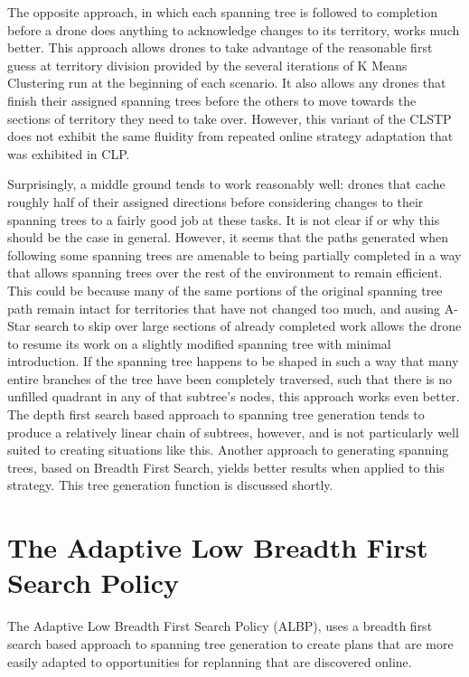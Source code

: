 The opposite approach, in which each spanning tree is followed to completion before a drone does anything to acknowledge changes to its territory, works much better. This approach allows drones to take advantage of the reasonable first guess at territory division provided by the several iterations of K Means Clustering run at the beginning of each scenario. It also allows any drones that finish their assigned spanning trees before the others to move towards the sections of territory they need to take over. However, this variant of the CLSTP does not exhibit the same fluidity from repeated online strategy adaptation that was exhibited in CLP.

Surprisingly, a middle ground tends to work reasonably well: drones that cache roughly half of their assigned directions before considering changes to their spanning trees to a fairly good job at these tasks. It is not clear if or why this should be the case in general. However, it seems that the paths generated when following some spanning trees are amenable to being partially completed in a way that allows spanning trees over the rest of the environment to remain efficient. This could be because many of the same portions of the original spanning tree path remain intact for territories that have not changed too much, and ausing A-Star search to skip over large sections of already completed work allows the drone to resume its work on a slightly modified spanning tree with minimal introduction. If the spanning tree happens to be shaped in such a way that many entire branches of the tree have been completely traversed, such that there is no unfilled quadrant in any of that subtree's nodes, this approach works even better. The depth first search based approach to spanning tree generation tends to produce a relatively linear chain of subtrees, however, and is not particularly well suited to creating situations like this. Another approach to generating spanning trees, based on Breadth First Search, yields better results when applied to this strategy. This tree generation function is discussed shortly.

\section{The Adaptive Low Breadth First Search Policy}

The Adaptive Low Breadth First Search Policy (ALBP), uses a breadth first search based approach to spanning tree generation to create plans that are more easily adapted to opportunities for replanning that are discovered online. 


